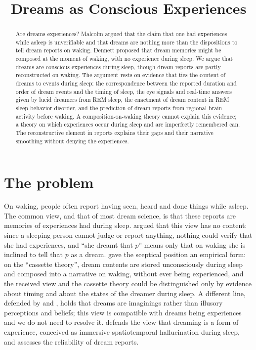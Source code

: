 \documentclass{situationist-preprint}
\title{Dreams as Conscious Experiences}
\begin{document}
\maketitle

\begin{abstract}
Are dreams experiences? Malcolm argued that the claim that one had experiences while asleep is unverifiable and that dreams are nothing more than the dispositions to tell dream reports on waking. Dennett proposed that dream memories might be composed at the moment of waking, with no experience during sleep. We argue that dreams are conscious experiences during sleep, though dream reports are partly reconstructed on waking. The argument rests on evidence that ties the content of dreams to events during sleep: the correspondence between the reported duration and order of dream events and the timing of sleep, the eye signals and real-time answers given by lucid dreamers from REM sleep, the enactment of dream content in REM sleep behavior disorder, and the prediction of dream reports from regional brain activity before waking. A composition-on-waking theory cannot explain this evidence; a theory on which experiences occur during sleep and are imperfectly remembered can. The reconstructive element in reports explains their gaps and their narrative smoothing without denying the experiences.
\end{abstract}

\section{The problem}

On waking, people often report having seen, heard and done things while asleep. The common view, and that of most dream science, is that these reports are memories of experiences had during sleep. \citet{Malcolm1959} argued that this view has no content: since a sleeping person cannot judge or report anything, nothing could verify that she had experiences, and \enquote{she dreamt that $p$} means only that on waking she is inclined to tell that $p$ as a dream. \citet{Dennett1976} gave the sceptical position an empirical form: on the \enquote{cassette theory}, dream contents are stored unconsciously during sleep and composed into a narrative on waking, without ever being experienced, and the received view and the cassette theory could be distinguished only by evidence about timing and about the states of the dreamer during sleep. A different line, defended by \citet{Sosa2005} and \citet{Ichikawa2009}, holds that dreams are imaginings rather than illusory perceptions and beliefs; this view is compatible with dreams being experiences and we do not need to resolve it. \citet{Windt2015} defends the view that dreaming is a form of experience, conceived as immersive spatiotemporal hallucination during sleep, and assesses the reliability of dream reports.
\end{document}
